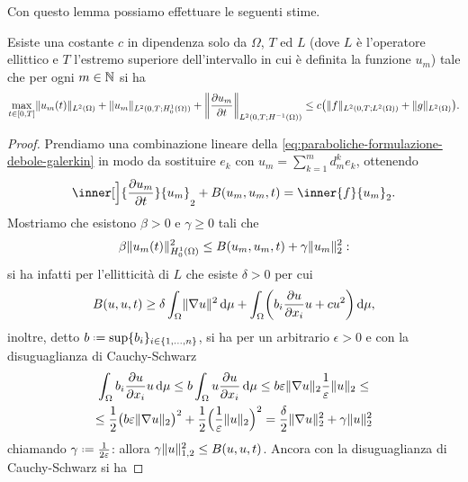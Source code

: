 Con questo lemma possiamo effettuare le seguenti stime.
\begin{teorema} \label{t:stime-energia-paraboliche}
    Esiste una costante $c$ in dipendenza solo da $\Omega$, $T$ ed $L$ (dove $L$ è l'operatore ellittico e $T$ l'estremo superiore dell'intervallo in cui è definita la funzione $u_m$) tale che per ogni $m\in\N$ si ha
    \begin{equation}
        \max_{t\in[0,T]}\norm{u_m(t)}_{\leb[2]{\Omega}}+\norm{u_m}_{\leb[2]{0,T;\sobHc[1]{\Omega}}}+\norm[\bigg]{\drp{u_m}{t}}_{\leb[2]{0,T;\sobH[-1]{\Omega}}}\le
        c\bigl(\norm{f}_{\leb[2]{0,T;\leb[2]{\Omega}}}+\norm{g}_{\leb[2]{\Omega}}\bigr).
    \end{equation}
\end{teorema}
\begin{proof}
    Prendiamo una combinazione lineare della \eqref{eq:paraboliche-formulazione-debole-galerkin} in modo da sostituire $e_k$ con $u_m=\sum_{k=1}^md^k_me_k$, ottenendo
    \begin{equation}
        \inner[\Big]{\drp{u_m}{t}}{u_m}_2+B(u_m,u_m,t)=\inner{f}{u_m}_2.
    \end{equation}
    Mostriamo che esistono $\beta>0$ e $\gamma\ge 0$ tali che
    \begin{equation}
        \beta\norm{u_m(t)}_{\sobHc[1]{\Omega}}^2\le
        B(u_m,u_m,t)+\gamma\norm{u_m}_2^2:
        \label{eq:dim-stime-energia-paraboliche1}
    \end{equation}
    si ha infatti per l'ellitticità di $L$ che esiste $\delta>0$ per cui
    \begin{equation}
        B(u,u,t)\ge
        \delta\int_\Omega\norm{\grad u}^2\,\dd\mu+\int_\Omega\biggl(b_i\drp{u}{x_i}u+cu^2\biggr)\,\dd\mu,
    \end{equation}
    inoltre, detto $b\defeq\sup\{b_i\}_{i\in\{1,\dotsc,n\}}$, si ha per un arbitrario $\epsilon>0$ e con la disuguaglianza di Cauchy-Schwarz
    \begin{multline}
        \int_\Omega b_i\drp{u}{x_i}u\,\dd\mu\le
        b\int_\Omega u\drp{u}{x_i}\,\dd\mu\le
        b\epsilon\norm{\grad u}_2\frac1{\epsilon}\norm{u}_2\le\\ \le
        \frac12\bigl(b\epsilon\norm{\grad u}_{2}\bigr)^2+\frac12\Bigl(\frac1{\epsilon}\norm{u}_2\Bigr)^2=
        \frac{\delta}2\norm{\grad u}_2^2+\gamma\norm{u}_2^2
    \end{multline}
    chiamando $\gamma\defeq\frac1{2\epsilon}$: allora $\gamma\norm{u}_{1,2}^2\le B(u,u,t)$.
    Ancora con la disuguaglianza di Cauchy-Schwarz si ha

\end{proof}
